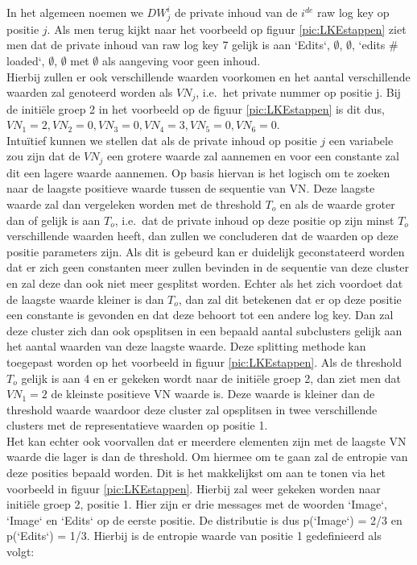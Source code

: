 \begin{itemize}
    In het algemeen noemen we \(DW_{j}^{i}\) de private inhoud van de \(i^{de}\) raw log key op positie $j$. Als men terug kijkt naar het voorbeeld op figuur \ref{pic:LKEstappen} ziet men dat de private inhoud van raw log key 7 gelijk is aan `Edits`, \(\emptyset\), \(\emptyset\), `edits \# loaded`, \(\emptyset\), \(\emptyset\) met \(\emptyset\) als aangeving voor geen inhoud.\\
    
   Hierbij zullen er ook verschillende waarden voorkomen en het aantal verschillende waarden zal genoteerd worden als \(VN_{j}\), i.e.\ het private nummer op positie j.
    Bij de initiële groep 2 in het voorbeeld op de figuur \ref{pic:LKEstappen} is dit dus, \(VN_{1} = 2, VN_{2} = 0, VN_{3} = 0, VN_{4} = 3, VN_{5} = 0, VN_{6} = 0\).\\
    
    Intuïtief kunnen we stellen dat als de private inhoud op positie $j$ een variabele zou zijn dat de \(VN_{j}\) een grotere waarde zal aannemen en voor een constante zal dit een lagere waarde aannemen. Op basis hiervan is het logisch om te zoeken naar de laagste positieve waarde tussen de sequentie van VN. Deze laagste waarde zal dan vergeleken worden met de threshold \(T_{o}\) en als de waarde groter dan of gelijk is aan \(T_{o}\), i.e.\ dat de private inhoud op deze positie op zijn minst \(T_{o}\) verschillende waarden heeft, dan zullen we concluderen dat de waarden op deze positie parameters zijn. Als dit is gebeurd kan er duidelijk geconstateerd worden dat er zich geen constanten meer zullen bevinden in de sequentie van deze cluster en zal deze dan ook niet meer gesplitst worden. Echter als het zich voordoet dat de laagste waarde kleiner is dan \(T_{o}\), dan zal dit betekenen dat er op deze positie een constante is gevonden en dat deze behoort tot een andere log key. Dan zal deze cluster zich dan ook opsplitsen in een bepaald aantal subclusters gelijk aan het aantal waarden van deze laagste waarde. Deze splitting methode kan toegepast worden op het voorbeeld in figuur \ref{pic:LKEstappen}. Als de threshold \(T_{o}\) gelijk is aan 4 en er gekeken wordt naar de initiële groep 2, dan ziet men dat \(VN_{1} = 2\) de kleinste positieve VN waarde is. Deze waarde is kleiner dan de threshold waarde waardoor deze cluster zal opsplitsen in twee verschillende clusters met de representatieve waarden op positie 1. \\
    
    Het kan echter ook voorvallen dat er meerdere elementen zijn met de laagste VN waarde die lager is dan de threshold. Om hiermee om te gaan zal de entropie van deze posities bepaald worden. Dit is het makkelijkst om aan te tonen via het voorbeeld in figuur \ref{pic:LKEstappen}. Hierbij zal weer gekeken worden naar initiële groep 2, positie 1. Hier zijn er drie messages met de woorden `Image`, `Image` en `Edits` op de eerste positie. De distributie is dus p(`Image`) = 2/3 en p(`Edits`) = 1/3. Hierbij is de entropie waarde van positie 1 gedefinieerd als volgt:
    

\end{itemize}

